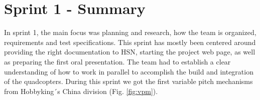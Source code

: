 
\section{Sprint 1 - Summary}

In sprint 1, the main focus was planning and research, how the team is organized, requirements and test specifications. This sprint has mostly been centered around providing the right documentation to HSN, starting the project web page, as well as preparing the first oral presentation. The team had to establish a clear understanding of how to work in parallel to accomplish the build and integration of the quadcopters. 
\newline \newline
During this sprint we got the first variable pitch mechanisms from Hobbyking´s China division (Fig. \ref{fig:vpm}). 

